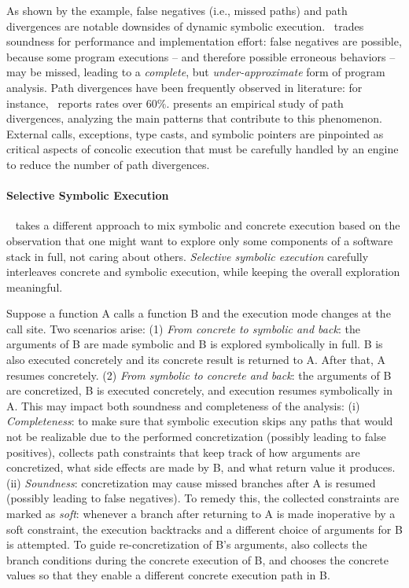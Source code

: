 As shown by the example, false negatives (i.e., missed paths) and path divergences are notable downsides of dynamic symbolic execution. \dse\ trades soundness for performance and implementation effort: false negatives are possible, because some program executions -- and therefore possible erroneous behaviors -- may be missed, leading to a {\em complete}, but {\em under-approximate} form of program analysis. Path divergences have been frequently observed in literature: for instance,~\cite{SAGE-NDSS08} reports rates over $60\%$. \cite{CLH-SCN15} presents an empirical study of path divergences, analyzing the main patterns that contribute to this phenomenon. External calls, exceptions, type casts, and symbolic pointers are pinpointed as critical aspects of concolic execution that must be carefully handled by an engine to reduce the number of path divergences.

\paragraph{Selective Symbolic Execution}
{\textsc \stwoe}~\cite{CKC-TOCS12} takes a different approach to mix symbolic and concrete execution based on the observation that one might want to explore only some components of a software stack in full, not caring about others. {\em Selective symbolic execution} carefully interleaves concrete and symbolic execution, while keeping the overall exploration meaningful.

Suppose a function A calls a function B and the execution mode changes at the call site. Two scenarios arise:
(1) {\em From concrete to symbolic and back}: the arguments of B are made symbolic and B is explored symbolically in full. B is also executed concretely and its concrete result is returned to A. After that, A resumes concretely. 
(2) {\em From symbolic to concrete and back}: the arguments of B are concretized, B is executed concretely, and execution resumes symbolically in A. This may impact both soundness and completeness of the analysis: (i) {\em Completeness}: to make sure that symbolic execution skips any paths that would not be realizable due to the performed concretization (possibly leading to false positives), {\textsc \stwoe} collects path constraints that keep track of how arguments are concretized, what side effects are made by B, and what return value it produces. (ii) {\em Soundness}: concretization may cause missed branches after A is resumed (possibly leading to false negatives). To remedy this, the collected constraints are marked as {\em soft}: whenever a branch after returning to A is made inoperative by a soft constraint, the execution backtracks and a different choice of arguments for B is attempted. To guide re-concretization of B's arguments, {\textsc \stwoe} also collects the branch conditions during the concrete execution of B, and chooses the concrete values so that they enable a different concrete execution path in B.

